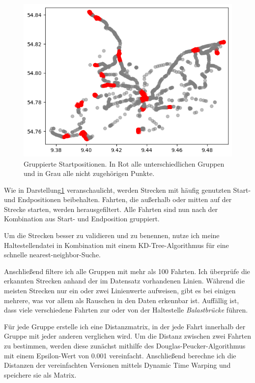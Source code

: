 \documentclass[a4paper]{article}
\begin{document}
    \begin{figure}[h]
        \includegraphics[scale=0.5]{figures/fig4_vorverarbeitung_start_cluster}
        \centering
        \caption{Gruppierte Startpositionen. In Rot alle unterschiedlichen Gruppen und in Grau alle nicht zugehörigen
        Punkte.}
        \label{fig:start_cluster}
    \end{figure}

    Wie in Darstellung\ref{fig:start_cluster} veranschaulicht, werden Strecken mit häufig genutzten Start- und
    Endpositionen beibehalten. Fahrten, die außerhalb oder mitten auf der Strecke starten, werden herausgefiltert. Alle
    Fahrten sind nun nach der Kombination aus Start- und Endposition gruppiert.

    Um die Strecken besser zu validieren und zu benennen, nutze ich meine Haltestellendatei in Kombination mit einem
    KD-Tree-Algorithmus\cite{kdtree} für eine schnelle nearest-neighbor-Suche.

    Anschließend filtere ich alle Gruppen mit mehr als 100 Fahrten. Ich überprüfe die erkannten Strecken anhand der im
    Datensatz vorhandenen Linien. Während die meisten Strecken nur ein oder zwei Linienwerte aufweisen, gibt es bei
    einigen mehrere, was vor allem als Rauschen in den Daten erkennbar ist. Auffällig ist, dass viele verschiedene
    Fahrten zur oder von der Haltestelle \textit{Balastbrücke} führen.

    Für jede Gruppe erstelle ich eine Distanzmatrix, in der jede Fahrt innerhalb der Gruppe mit jeder anderen verglichen
    wird. Um die Distanz zwischen zwei Fahrten zu bestimmen, werden diese zunächst mithilfe des
    Douglas-Peucker-Algorithmus\cite{douglaspeucker} mit einem Epsilon-Wert von 0.001 vereinfacht. Anschließend berechne
    ich die Distanzen der vereinfachten Versionen mittels Dynamic Time Warping\cite{dtw} und speichere sie als Matrix.
\end{document}
